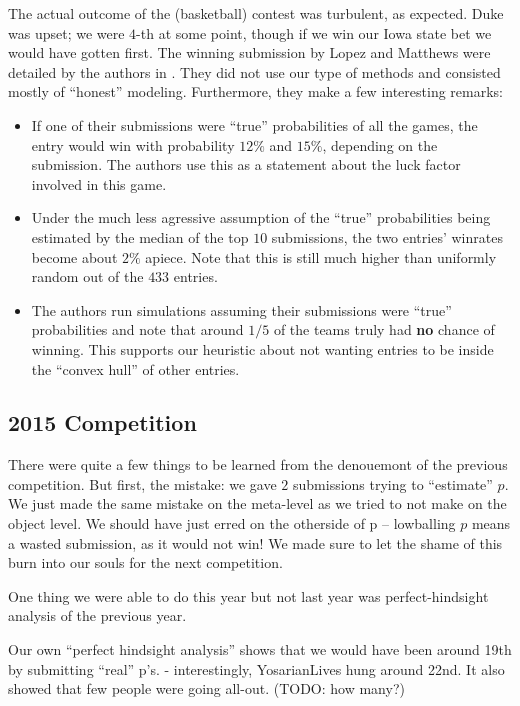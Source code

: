 \documentclass[12pt,twoside,singlespace]{article}
\numberwithin{equation}{section}
\theoremstyle{definition}
\begin{document}
The actual outcome of the (basketball) contest was turbulent, as expected. Duke was upset; we were $4$-th at some point, though if we win our Iowa state bet we would have gotten first. The winning submission by Lopez and Matthews were detailed by the authors in \cite{lopez}. They did not use our type of methods and consisted mostly of ``honest'' modeling. Furthermore, they make a few interesting remarks:
\begin{itemize}
\item If one of their submissions were ``true'' probabilities of all the games, the entry would win with probability $12\%$ and $15\%$, depending on the submission. The authors use this as a statement about the luck factor involved in this game.
\item Under the much less agressive assumption of the ``true'' probabilities being estimated by the median of the top $10$ submissions, the two entries' winrates become about $2\%$ apiece. Note that this is still much higher than uniformly random out of the $433$ entries.
\item The authors run simulations assuming their submissions were ``true'' probabilities and note that around $1/5$ of the teams truly had \textbf{no} chance of winning. This supports our heuristic about not wanting entries to be inside the ``convex hull'' of other entries.
\end{itemize}


\subsection{2015 Competition}

There were quite a few things to be learned from the denouemont of the previous competition. But first, the mistake: we gave $2$ submissions trying to ``estimate'' $p$. We just made the same mistake on the meta-level as we tried to not make on the object level. We should have just erred on the otherside of p -- lowballing $p$ means a wasted submission, as it would not win! We made sure to let the shame of this burn into our souls for the next competition.

One thing we were able to do this year but not last year was perfect-hindsight analysis of the previous year. 

Our own ``perfect hindsight analysis'' shows that we would have been around 19th by submitting ``real'' p's. - interestingly, YosarianLives hung around 22nd. It also showed that few people were going all-out. (TODO: how many?)
\end{document}
